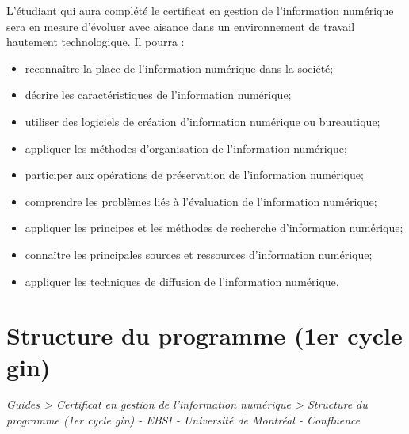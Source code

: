 \documentclass [12 pt]{article}
\begin{document}
            L'étudiant qui aura complété le certificat en gestion de l'information numérique sera
                en mesure d'évoluer avec aisance dans un environnement de travail hautement
                technologique. Il pourra :
            
        \begin{itemize}
        
                
        \item reconnaître la place de l'information numérique dans la société;
                
        \item décrire les caractéristiques de l'information numérique;
                
        \item utiliser des logiciels de création d'information numérique ou bureautique;
                
        \item appliquer les méthodes d'organisation de l'information numérique;
                
        \item participer aux opérations de préservation de l'information numérique;
                
        \item comprendre les problèmes liés à l'évaluation de l'information numérique;
                
        \item appliquer les principes et les méthodes de recherche d'information
                    numérique;
                
        \item connaître les principales sources et ressources d'information numérique;
                
        \item appliquer les techniques de diffusion de l'information numérique.
            
        \end{itemize}
    
        
    
    
        \newpage
        \section {
        Structure du programme (1er cycle gin)
        }
        
        
        
        \textit{
        Guides > Certificat en gestion de l'information numérique > Structure du
            programme (1er cycle gin) - EBSI - Université de Montréal - Confluence
        }
    
\end{document}
